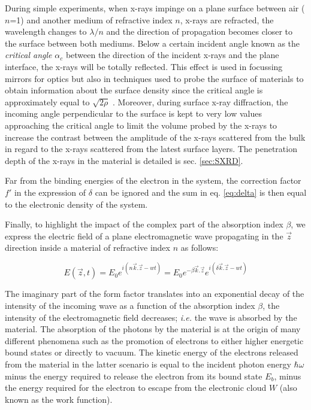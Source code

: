 During simple experiments, when x-rays impinge on a plane surface between air ($n$=1) and another medium of refractive index $n$, x-rays are refracted, the wavelength changes to $\lambda/n$ and the direction of propagation becomes closer to the surface between both mediums.
Below a certain incident angle known as the \textit{critical angle} $\alpha_c$ between the direction of the incident x-rays and the plane interface, the x-rays will be totally reflected.
This effect is used in focussing mirrors for optics but also in techniques used to probe the surface of materials to obtain information about the surface density since the critical angle is approximately equal to $\sqrt{2\rho}$ \parencite{Willmott}.
Moreover, during surface x-ray diffraction, the incoming angle perpendicular to the surface is kept to very low values approaching the critical angle to limit the volume probed by the x-rays to increase the contrast between the amplitude of the x-rays scattered from the bulk in regard to the x-rays scattered from the latest surface layers.
The penetration depth of the x-rays in the material is detailed is sec. \ref{sec:SXRD}.

Far from the binding energies of the electron in the system, the correction factor $f'$ in the expression of $\delta$ can be ignored and the sum in eq. \ref{eq:delta} is then equal to the electronic density of the system.

Finally, to highlight the impact of the complex part of the absorption index $\beta$, we express the electric field of a plane electromagnetic wave propagating in the $\vec{z}$ direction inside a material of refractive index $n$ as follows:

\begin{equation}
    E(\vec{z}, t) = E_0 e^{i(n\vec{k}.\vec{z} - wt)} = E_0 e^{-\beta \vec{k}.\vec{z}} e^{i(\delta\vec{k}.\vec{z} - wt)}
\end{equation}

The imaginary part of the form factor translates into an exponential decay of the intensity of the incoming wave as a function of the absorption index $\beta$, the intensity of the electromagnetic field decreases; \textit{i.e.} the wave is absorbed by the material.
The absorption of the photons by the material is at the origin of many different phenomena such as the promotion of electrons to either higher energetic bound states or directly to vacuum.
The kinetic energy of the electrons released from the material in the latter scenario is equal to the incident photon energy $\hbar\omega$ minus the energy required to release the electron from its bound state $E_b$, minus the energy required for the electron to escape from the electronic cloud $W$ (also known as the work function).

